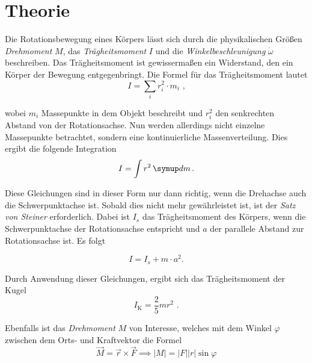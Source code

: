 \section{Theorie}
\label{sec:Theorie}
\setlength{\parindent}{0pt}

Die Rotationsbewegung eines Körpers lässt sich durch die physikalischen Größen \textit{Drehmoment} $M$, das 
\textit{Trägheitsmoment} $I$ und die \textit{Winkelbeschleunigung} $\dot{\omega}$ beschreiben.
Das Trägheitsmoment ist gewissermaßen ein Widerstand, den ein Körper der Bewegung entgegenbringt.
Die Formel für das Trägheitsmoment lautet
\begin{equation*}
    I = \sum_{i} r_{i}^2 \cdot m_{i} \text{ ,}
\end{equation*}

wobei $m_{i}$ Massepunkte in dem Objekt beschreibt und $r_{i}^2$ den senkrechten Abstand von der Rotationsachse.
Nun werden allerdings nicht einzelne Massepunkte betrachtet, sondern eine kontinuierliche Massenverteilung.
Dies ergibt die folgende Integration
\begin{equation}
    I = \int r^2 \dif{m} \text{.}
\end{equation}

Diese Gleichungen sind in dieser Form nur dann richtig, wenn die Drehachse auch die Schwerpunktachse ist.
Sobald dies nicht mehr gewährleistet ist, ist der \textit{Satz von Steiner} erforderlich.
Dabei ist $I_{s}$ das Trägheitsmoment des Körpers, wenn die Schwerpunktachse der Rotationsachse entspricht
und $a$ der parallele Abstand zur Rotationsachse ist. Es folgt

\begin{equation} \label{eq:SatzvSteiner}
    I = I_{s} + m \cdot a^2 \text{.}
\end{equation}

Durch Anwendung dieser Gleichungen, ergibt sich das Trägheitsmoment der Kugel
\begin{equation} \label{eq:AllgTreagKugel}
  I_{\text{K}} = \frac{2}{5} m r^2 \text{ .}
\end{equation}

Ebenfalls ist das \textit{Drehmoment} $M$ von Interesse, welches mit dem Winkel $\varphi$ zwischen dem Orts- und Kraftvektor die Formel
\begin{equation} \label{eq:drehmoment}
    \vec{M} = \vec{r} \times \vec{F} \implies \lvert M \rvert = \lvert F \rvert \lvert r \rvert \sin{\varphi}
\end{equation}

